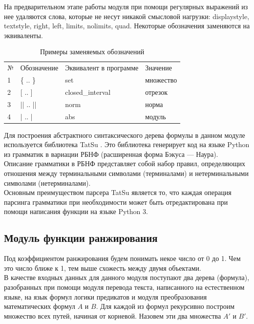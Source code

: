 \documentclass[12pt]{article}
\begin{document}
 На предварительном этапе работы модуля при помощи регулярных выражений из нее удаляются слова, которые не несут никакой смысловой нагрузки:
displaystyle, textstyle, right, left, limits, nolimits, quad. Некоторые обозначения заменяются на эквиваленты.

\begin{table}[h!]
\begin{tabular}{ l l l l}
№ & Обозначение & Эквивалент в программе & Значение  \\
1 & \{ .. \} & set  & множество\\
2 & [ .. ] & closed\_interval  & отрезок \\
3 & || .. || & norm & норма \\
4 & | .. | & abs & модуль \\

\end{tabular}
\label{table:satellites}
  \caption{Примеры заменяемых обозначений}
\end{table} 

Для построения абстрактного синтаксического дерева формулы в данном модуле используется библиотека TatSu . Это библиотека генерирует код на языке Python из грамматик в вариации РБНФ (расширенная форма Бэкуса — Наура).\\

Описание грамматики в РБНФ представляет собой набор правил, определяющих отношения между терминальными символами (терминалами) и нетерминальными символами (нетерминалами). \\

Основным преимуществом парсера TatSu является то, что каждая операция парсинга грамматики при необходимости может быть отредактирована при помощи написания функции на языке Python 3.

\newpage
\subsection{Модуль функции ранжирования}
 Под коэффициентом ранжирования будем понимать некое число от 0 до 1. Чем это число ближе к 1, тем выше схожесть между двумя объектами.\\

В качестве входных данных для данного модуля поступают два дерева (формула), разобранных при помощи  модуля перевода текста, написанного на естественном языке, на язык формул логики предикатов и модуля преобразования математических формул $A$ и $B$. Для каждой из формул рекурсивно построим множество всех путей, начиная от корневой. Назовем эти два множества $A'$ и $B'$.\\
\end{document}
